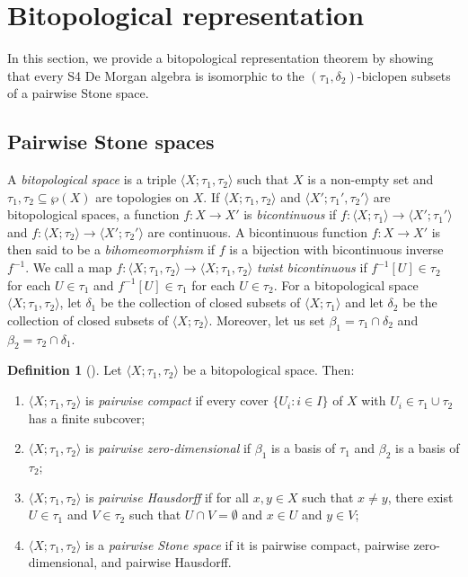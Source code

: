 \documentclass{amsart}
\theoremstyle{plain}
\newcommand{\tuple}[1]{\ensuremath{\langle{#1}\rangle}}
\theoremstyle{definition}
\newtheorem{definition}[theorem]{Definition}
\begin{document}
 






\section{Bitopological representation} \label{sec:representation}

In this section, we provide a bitopological representation theorem by showing that every S4 De Morgan algebra is isomorphic to the $(\tau_1,\delta_2)$-biclopen subsets of a pairwise Stone space. 
\subsection{Pairwise Stone spaces}
A \emph{bitopological space} is a triple $\tuple{X;\tau_1,\tau_2}$ such that $X$ is a non-empty set and $\tau_1,\tau_2\subseteq\wp(X)$ are topologies on $X$. If $\tuple{X;\tau_1,\tau_2}$ and $\langle X';\tau_1',\tau_2'\rangle$ are bitopological spaces, a function $f\colon X\to X'$ is \emph{bicontinuous} if $f\colon \langle X;\tau_1\rangle\to\langle X';\tau_1'\rangle$ and $f\colon \langle X;\tau_2\rangle\to\langle X';\tau_2'\rangle$ are continuous. A bicontinuous function $f\colon X\to X'$ is then said to be a \emph{bihomeomorphism} if $f$ is a bijection with bicontinuous inverse $f^{-1}$. We call a map $f\colon\tuple{X;\tau_1,\tau_2}\to\tuple{X;\tau_1,\tau_2}$ \emph{twist bicontinuous} if $f^{-1}[U]\in\tau_2$ for each $U\in\tau_1$ and $f^{-1}[U]\in\tau_1$ for each $U\in\tau_2$. For a bitopological space $\tuple{X;\tau_1,\tau_2}$, let $\delta_1$ be the collection of closed subsets of $\tuple{X;\tau_1}$ and let $\delta_2$ be the collection of closed subsets of $\tuple{X;\tau_2}$. Moreover, let us set $\beta_1=\tau_1 \cap \delta_2$ and $\beta_2=\tau_2 \cap \delta_1$.
\begin{definition}[\cite{Salbany:BitopologicalSpaces,bezhanishvili}]\label{pairwise stone space}
    Let $\tuple{X;\tau_1,\tau_2}$ be a bitopological space. Then: 
    \begin{enumerate}
        \item $\tuple{X;\tau_1,\tau_2}$ is \emph{pairwise compact} if every cover $\{U_i:i\in I\}$ of $X$ with $U_i\in\tau_1\cup\tau_2$ has a finite subcover; 
        \item $\tuple{X;\tau_1,\tau_2}$ is \emph{pairwise zero-dimensional} if $\beta_1$ is a basis of $\tau_1$ and $\beta_2$ is a basis of $\tau_2$; 
        \item $\tuple{X;\tau_1,\tau_2}$ is \emph{pairwise Hausdorff} if for all $x,y\in X$ such that $x\not=y$, there exist $U\in\tau_1$ and $V\in\tau_2$ such that $U\cap V=\emptyset$ and $x\in U$ and $y\in V$; 
        \item $\tuple{X;\tau_1,\tau_2}$ is a \emph{pairwise Stone space} if it is pairwise compact, pairwise zero-dimensional, and pairwise Hausdorff. 
    \end{enumerate}
\end{definition}
\end{document}
